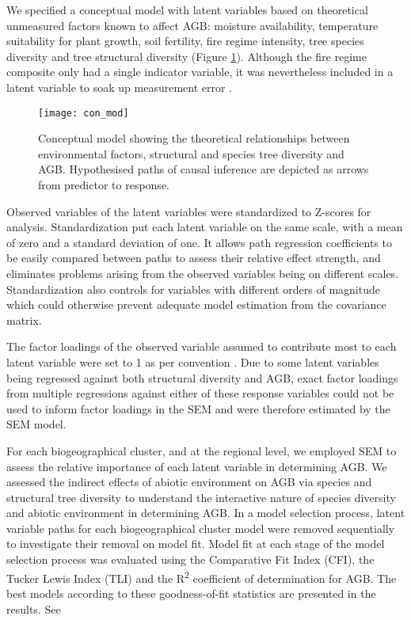 \documentclass[11pt,a4paper]{article}
\begin{document}
We specified a conceptual model with latent variables based on theoretical unmeasured factors known to affect AGB: moisture availability, temperature suitability for plant growth, soil fertility, fire regime intensity, tree species diversity and tree structural diversity (Figure \ref{con_mod}). Although the fire regime composite only had a single indicator variable, it was nevertheless included in a latent variable to soak up measurement error \citep{}.

\begin{figure}[H]
\centering
	\texttt{[image: con\_mod]}
	\caption{Conceptual model showing the theoretical relationships between environmental factors, structural and species tree diversity and AGB. Hypothesised paths of causal inference are depicted as arrows from predictor to response.}
	\label{con_mod}
\end{figure}

Observed variables of the latent variables were standardized to Z-scores for analysis. Standardization put each latent variable on the same scale, with a mean of zero and a standard deviation of one. It allows path regression coefficients to be easily compared between paths to assess their relative effect strength, and eliminates problems arising from the observed variables being on different scales. Standardization also controls for variables with different orders of magnitude which could otherwise prevent adequate model estimation from the covariance matrix.

The factor loadings of the observed variable assumed to contribute most to each latent variable were set to 1 as per convention \citep{}. Due to some latent variables being regressed against both structural diversity and AGB, exact factor loadings from multiple regressions against either of these response variables could not be used to inform factor loadings in the SEM and were therefore estimated by the SEM model.

For each biogeographical cluster, and at the regional level, we employed SEM to assess the relative importance of each latent variable in determining AGB. We assessed the indirect effects of abiotic environment on AGB via species and structural tree diversity to understand the interactive nature of species diversity and abiotic environment in determining AGB. In a model selection process, latent variable paths for each biogeographical cluster model were removed sequentially to investigate their removal on model fit. Model fit at each stage of the model selection process was evaluated using the Comparative Fit Index (CFI), the Tucker Lewis Index (TLI) and the R\textsuperscript{2} coefficient of determination for AGB. The best models according to these goodness-of-fit statistics are presented in the results. See 
\end{document}
